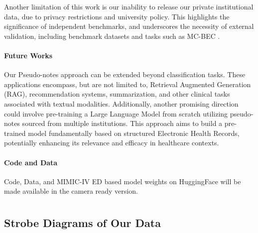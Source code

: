 \documentclass[pmlr]{jmlr}%
\begin{document}
{Another limitation of this work is our inability to release our private institutional data, due to privacy restrictions and university policy. This highlights the significance of independent benchmarks, and underscores the necessity of external validation, including benchmark datasets and tasks such as MC-BEC \citep{chen2023multimodal}.

\paragraph{Future Works}
Our Pseudo-notes approach can be extended beyond classification tasks. These applications encompass, but are not limited to, Retrieval Augmented Generation (RAG), recommendation systems, summarization, and other clinical tasks associated with textual modalities. Additionally, another promising direction could involve pre-training a Large Language Model from scratch utilizing pseudo-notes sourced from multiple institutions. This approach aims to build a pre-trained model fundamentally based on structured Electronic Health Records, potentially enhancing its relevance and efficacy in healthcare contexts.

\paragraph{Code and Data} Code, Data, and MIMIC-IV ED based model weights on HuggingFace will be made available in the camera ready version.

\newpage





\newpage
\appendix
\section{}


\subsection{Strobe Diagrams of Our Data}
\label{strober}

}
\end{document}
